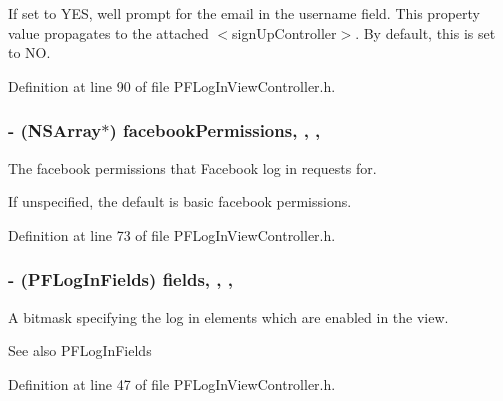 If set to {\ttfamily Y\+E\+S}, we\textquotesingle{}ll prompt for the email in the username field. This property value propagates to the attached $<$sign\+Up\+Controller$>$. By default, this is set to {\ttfamily N\+O}. 

Definition at line 90 of file P\+F\+Log\+In\+View\+Controller.\+h.

\hypertarget{interface_p_f_log_in_view_controller_aa6a5f7937240b2bc552a764b3108d7dd}{}
\subsubsection[{facebook\+Permissions}]{\setlength{\rightskip}{0pt plus 5cm}-\/ (N\+S\+Array$\ast$) facebook\+Permissions\hspace{0.3cm}{\ttfamily [read]}, {\ttfamily [write]}, {\ttfamily [nonatomic]}, {\ttfamily [copy]}}\label{interface_p_f_log_in_view_controller_aa6a5f7937240b2bc552a764b3108d7dd}
The facebook permissions that Facebook log in requests for.

If unspecified, the default is basic facebook permissions. 

Definition at line 73 of file P\+F\+Log\+In\+View\+Controller.\+h.

\hypertarget{interface_p_f_log_in_view_controller_a9e150a6faf7e08e6bcfb5f120c02ba6f}{}
\subsubsection[{fields}]{\setlength{\rightskip}{0pt plus 5cm}-\/ (P\+F\+Log\+In\+Fields) fields\hspace{0.3cm}{\ttfamily [read]}, {\ttfamily [write]}, {\ttfamily [nonatomic]}, {\ttfamily [assign]}}\label{interface_p_f_log_in_view_controller_a9e150a6faf7e08e6bcfb5f120c02ba6f}
A bitmask specifying the log in elements which are enabled in the view.

\begin{DoxySeeAlso}{See also}
P\+F\+Log\+In\+Fields 
\end{DoxySeeAlso}


Definition at line 47 of file P\+F\+Log\+In\+View\+Controller.\+h.

